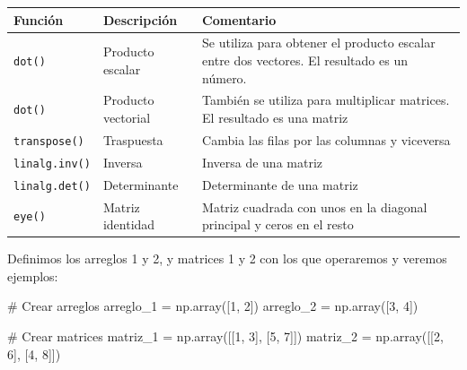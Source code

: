 \documentclass[
  letterpaper,
  DIV=11,
  numbers=noendperiod]{scrreprt}
\newenvironment{Shaded}{\begin{snugshade}}{\end{snugshade}}
\newcommand{\CommentTok}[1]{\textcolor[rgb]{0.37,0.37,0.37}{#1}}
\newcommand{\DecValTok}[1]{\textcolor[rgb]{0.68,0.00,0.00}{#1}}
\newcommand{\NormalTok}[1]{\textcolor[rgb]{0.00,0.23,0.31}{#1}}
\newcommand{\OperatorTok}[1]{\textcolor[rgb]{0.37,0.37,0.37}{#1}}
\begin{document}
\begin{longtable}[]{@{}
  >{\raggedright\arraybackslash}p{}
  >{\raggedright\arraybackslash}p{}
  >{\raggedright\arraybackslash}p{}@{}}
\toprule\noalign{}
\begin{minipage}[b]{\linewidth}\raggedright
Función
\end{minipage} & \begin{minipage}[b]{\linewidth}\raggedright
Descripción
\end{minipage} & \begin{minipage}[b]{\linewidth}\raggedright
Comentario
\end{minipage} \\
\midrule\noalign{}
\endhead
\bottomrule\noalign{}
\endlastfoot
\texttt{dot()} & Producto escalar & Se utiliza para obtener el producto
escalar entre dos vectores. El resultado es un número. \\
\texttt{dot()} & Producto vectorial & También se utiliza para
multiplicar matrices. El resultado es una matriz \\
\texttt{transpose()} & Traspuesta & Cambia las filas por las columnas y
viceversa \\
\texttt{linalg.inv()} & Inversa & Inversa de una matriz \\
\texttt{linalg.det()} & Determinante & Determinante de una matriz \\
\texttt{eye()} & Matriz identidad & Matriz cuadrada con unos en la
diagonal principal y ceros en el resto \\
\end{longtable}

Definimos los arreglos 1 y 2, y matrices 1 y 2 con los que operaremos y
veremos ejemplos:

\begin{Shaded}
\begin{Highlighting}[]
\CommentTok{\# Crear arreglos}
\NormalTok{arreglo\_1 }\OperatorTok{=}\NormalTok{ np.array([}\DecValTok{1}\NormalTok{, }\DecValTok{2}\NormalTok{])}
\NormalTok{arreglo\_2 }\OperatorTok{=}\NormalTok{ np.array([}\DecValTok{3}\NormalTok{, }\DecValTok{4}\NormalTok{])}

\CommentTok{\# Crear matrices}
\NormalTok{matriz\_1 }\OperatorTok{=}\NormalTok{ np.array([[}\DecValTok{1}\NormalTok{, }\DecValTok{3}\NormalTok{], [}\DecValTok{5}\NormalTok{, }\DecValTok{7}\NormalTok{]])}
\NormalTok{matriz\_2 }\OperatorTok{=}\NormalTok{ np.array([[}\DecValTok{2}\NormalTok{, }\DecValTok{6}\NormalTok{], [}\DecValTok{4}\NormalTok{, }\DecValTok{8}\NormalTok{]])}
\end{Highlighting}
\end{Shaded}
\end{document}
